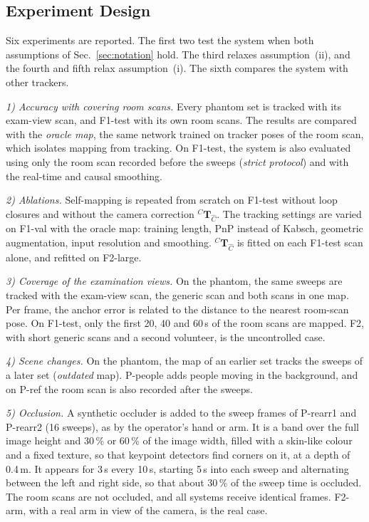 \documentclass[9pt,shortpaper,twoside,web]{ieeecolor2}
\newcommand{\Tf}[2]{{}^{#1}\mathbf{T}_{#2}}
\newcommand{\Ch}{\hat{C}}%
\newcommand{\Tcorr}{\Tf{C}{\Ch}}%
\newcommand{\Pref}{P-ref}
\newcommand{\Prearra}{P-rearr1}
\newcommand{\Prearrb}{P-rearr2}
\newcommand{\Ppeople}{P-people}
\newcommand{\Fval}{F1-val}
\newcommand{\Ftest}{F1-test}
\newcommand{\Ftwo}{F2}
\newcommand{\Flarge}{F2-large}
\newcommand{\Farm}{F2-arm}
\begin{document}
\subsection{Experiment Design}
Six experiments are reported. The first two test the system when both assumptions of Sec.~\ref{sec:notation} hold. The third relaxes assumption~(ii), and the fourth and fifth relax assumption~(i). The sixth compares the system with other trackers.

\emph{1) Accuracy with covering room scans.} Every phantom set is tracked with its exam-view scan, and \Ftest{} with its own room scans. The results are compared with the \emph{oracle map}, the same network trained on tracker poses of the room scan, which isolates mapping from tracking. On \Ftest{}, the system is also evaluated using only the room scan recorded before the sweeps (\emph{strict protocol}) and with the real-time and causal smoothing.  

\emph{2) Ablations.} Self-mapping is repeated from scratch on \Ftest{} without loop closures and without the camera correction $\Tcorr$. The tracking settings are varied on \Fval{} with the oracle map: training length, PnP instead of Kabsch, geometric augmentation, input resolution and smoothing. $\Tcorr$ is fitted on each \Ftest{} scan alone, and refitted on \Flarge{}.

\emph{3) Coverage of the examination views.} On the phantom, the same sweeps are tracked with the exam-view scan, the generic scan and both scans in one map. Per frame, the anchor error is related to the distance to the nearest room-scan pose. On \Ftest{}, only the first 20, 40 and 60\,s of the room scans are mapped. \Ftwo{}, with short generic scans and a second volunteer, is the uncontrolled case.

\emph{4) Scene changes.} On the phantom, the map of an earlier set tracks the sweeps of a later set (\emph{outdated} map). \Ppeople{} adds people moving in the background, and on \Pref{} the room scan is also recorded after the sweeps.

\emph{5) Occlusion.} A synthetic occluder is added to the sweep frames of \Prearra{} and \Prearrb{} (16 sweeps), as by the operator's hand or arm. It is a band over the full image height and 30\,\% or 60\,\% of the image width, filled with a skin-like colour and a fixed texture, so that keypoint detectors find corners on it, at a depth of 0.4\,m. It appears for 3\,s every 10\,s, starting 5\,s into each sweep and alternating between the left and right side, so that about 30\,\% of the sweep time is occluded. The room scans are not occluded, and all systems receive identical frames. \Farm{}, with a real arm in view of the camera, is the real case.
\end{document}
